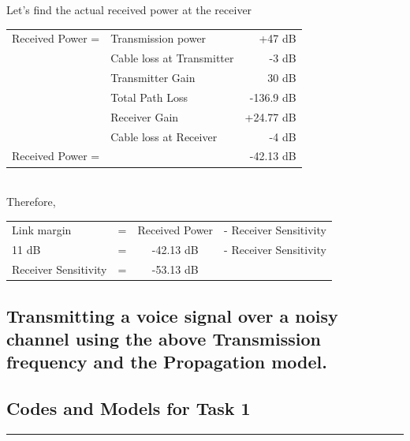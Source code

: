 \documentclass[a4paper,11pt]{article}%
\begin{document}
Let's find the actual received power at the receiver\\

\begin{tabular}{|l l| r|}
	\hline
Received Power =	&Transmission power & +47 dB\\
&	Cable loss at Transmitter & -3 dB\\
&	Transmitter Gain & 30 dB\\
&	Total Path Loss & -136.9 dB\\
&	Receiver Gain &+24.77 dB\\
&	Cable loss at Receiver &-4 dB\\\hline
Received Power =&&-42.13 dB\\\hline\hline
\end{tabular}\\[1cm]


Therefore,\\
\begin{center}
	\begin{tabular}{l c c c}
Link margin  & =& Received Power& - Receiver Sensitivity\\
11 dB& = &-42.13 dB& - Receiver Sensitivity\\
Receiver Sensitivity &= &-53.13 dB& \\\hline\hline
	\end{tabular}
\end{center}

\subsection{Transmitting a voice signal over a noisy channel using the above Transmission frequency and the Propagation model.}





\pagebreak
\subsection{Codes and Models for Task 1}




\vfill
\hrule



\end{document}
